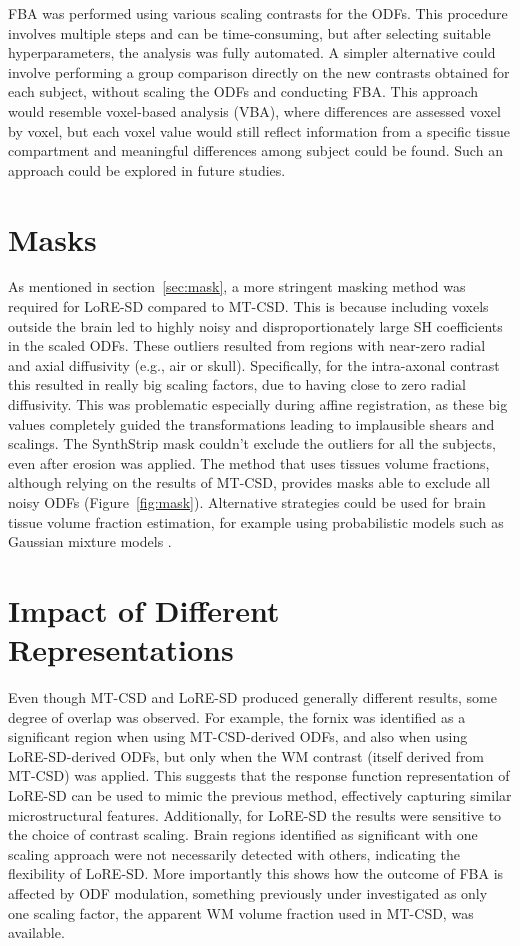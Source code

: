 FBA was performed using various scaling contrasts for the ODFs. This procedure involves multiple steps and can be time-consuming, but after selecting suitable hyperparameters, the analysis was fully automated. A simpler alternative could involve performing a group comparison directly on the new contrasts obtained for each subject, without scaling the ODFs and conducting FBA. This approach would resemble voxel-based analysis (VBA), where differences are assessed voxel by voxel, but each voxel value would still reflect information from a specific tissue compartment and meaningful differences among subject could be found. Such an approach could be explored in future studies.

\section{Masks}
As mentioned in section~\ref{sec:mask}, a more stringent masking method was required for LoRE-SD compared to MT-CSD. This is because including voxels outside the brain led to highly noisy and disproportionately large SH coefficients in the scaled ODFs. These outliers resulted from regions with near-zero radial and axial diffusivity (e.g., air or skull). Specifically, for the intra-axonal contrast this resulted in really big scaling factors, due to having close to zero radial diffusivity. This was problematic especially during affine registration, as these big values completely guided the transformations leading to implausible shears and scalings. The SynthStrip mask couldn't exclude the outliers for all the subjects, even after erosion was applied. The method that uses tissues volume fractions, although relying on the results of MT-CSD, provides masks able to exclude all noisy ODFs (Figure~\ref{fig:mask}).
Alternative strategies could be used for brain tissue volume fraction estimation, for example using probabilistic models such as Gaussian mixture models \cite{zhang2001}.

\section{Impact of Different Representations}
Even though MT-CSD and LoRE-SD produced generally different results, some degree of overlap was observed. For example, the fornix was identified as a significant region when using MT-CSD-derived ODFs, and also when using LoRE-SD-derived ODFs, but only when the WM contrast (itself derived from MT-CSD) was applied. This suggests that the response function representation of LoRE-SD can be used to mimic the previous method, effectively capturing similar microstructural features.
Additionally, for LoRE-SD the results were sensitive to the choice of contrast scaling. Brain regions identified as significant with one scaling approach were not necessarily detected with others, indicating the flexibility of LoRE-SD. More importantly this shows how the outcome of FBA is affected by ODF modulation, something previously under investigated as only one scaling factor, the apparent WM volume fraction used in MT-CSD, was available.


